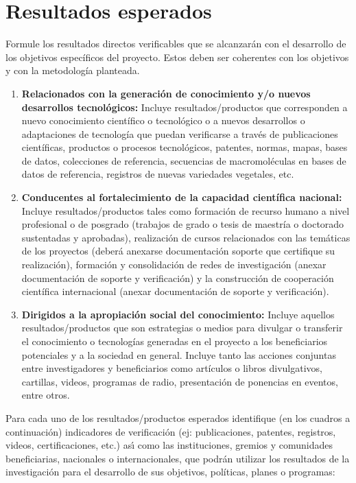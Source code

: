 \section{Resultados esperados}	
\begin{instrucciones}
  Formule los resultados directos verificables que se
alcanzarán con el desarrollo de los objetivos específicos del proyecto. Estos deben ser coherentes
con los objetivos y con la metodología planteada.


  \begin{enumerate}
  \item \textbf{Relacionados con la generación de conocimiento y/o nuevos desarrollos
 tecnológicos:} Incluye resultados/productos que corresponden a nuevo
 conocimiento científico o tecnológico o a nuevos desarrollos o adaptaciones de
 tecnología que puedan verificarse a través de publicaciones científicas,
 productos o procesos tecnológicos, patentes, normas, mapas, bases de datos,
 colecciones de referencia, secuencias de macromoléculas en bases de datos de
 referencia, registros de nuevas variedades vegetales, etc.
\item \textbf{Conducentes al fortalecimiento de la capacidad científica
  nacional:} Incluye resultados/productos tales como formación de
  recurso humano a nivel profesional o de posgrado (trabajos de grado
  o tesis de maestría o doctorado sustentadas y aprobadas),
  realización de cursos relacionados con las temáticas de los
  proyectos (deberá anexarse documentación soporte que certifique su
  realización), formación y consolidación de redes de investigación
  (anexar documentación de soporte y verificación) y la construcción
  de cooperación científica internacional (anexar documentación de
  soporte y verificación).
\item \textbf{Dirigidos a la apropiación social del conocimiento:}
  Incluye aquellos resultados/productos que son estrategias o medios
  para divulgar o transferir el conocimiento o tecnologías generadas
  en el proyecto a los beneficiarios potenciales y a la sociedad en
  general. Incluye tanto las acciones conjuntas entre investigadores y
  beneficiarios como artículos o libros divulgativos, cartillas,
  videos, programas de radio, presentación de ponencias en eventos,
  entre otros.
  \end{enumerate}

  Para cada uno de los resultados/productos esperados identifique (en
  los cuadros a continuación) indicadores de verificación (ej:
  publicaciones, patentes, registros, videos, certificaciones, etc.)
  as\'\i{} como las instituciones, gremios y comunidades beneficiarias,
  nacionales o internacionales, que podrán utilizar los resultados de
  la investigación para el desarrollo de sus objetivos, políticas,
  planes o programas:

\end{instrucciones}

